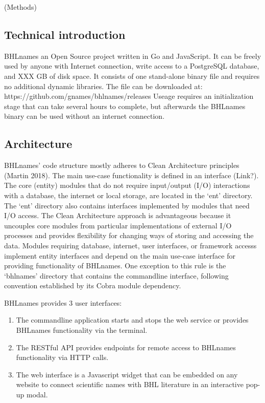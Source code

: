 \documentclass[
]{article}
\begin{document}
(Methods)

\hypertarget{technical-introduction}{%
\subsection{Technical introduction}\label{technical-introduction}}

BHLnames an Open Source project written in Go and JavaScript. It can be
freely used by anyone with Internet connection, write access to a
PostgreSQL database, and XXX GB of disk space. It consists of one
stand-alone binary file and requires no additional dynamic libraries.
The file can be downloaded at:
https://github.com/gnames/bhlnames/releases Useage requires an
initialization stage that can take several hours to complete, but
afterwards the BHLnames binary can be used without an internet
connection.

\hypertarget{architecture}{%
\subsection{Architecture}\label{architecture}}

BHLnames' code structure mostly adheres to Clean Architecture principles
(Martin 2018). The main use-case functionality is defined in an
interface (Link?). The core (entity) modules that do not require
input/output (I/O) interactions with a database, the internet or local
storage, are located in the `ent' directory. The `ent' directory also
contains interfaces implemented by modules that need I/O access. The
Clean Architecture approach is advantageous because it uncouples core
modules from particular implementations of external I/O processes and
provides flexibility for changing ways of storing and accessing the
data. Modules requiring database, internet, user interfaces, or
framework accesss implement entity interfaces and depend on the main
use-case interface for providing functionality of BHLnames. One
exception to this rule is the `bhlnames' directory that contains the
commandline interface, following convention established by its Cobra
module dependency.

BHLnames provides 3 user interfaces:

\begin{enumerate}
\def\labelenumi{\arabic{enumi}.}
\item
  The commandline application starts and stops the web service or
  provides BHLnames functionality via the terminal.
\item
  The RESTful API provides endpoints for remote access to BHLnames
  functionality via HTTP calls.
\item
  The web interface is a Javascript widget that can be embedded on any
  website to connect scientific names with BHL literature in an
  interactive pop-up modal.
\end{enumerate}
\end{document}

